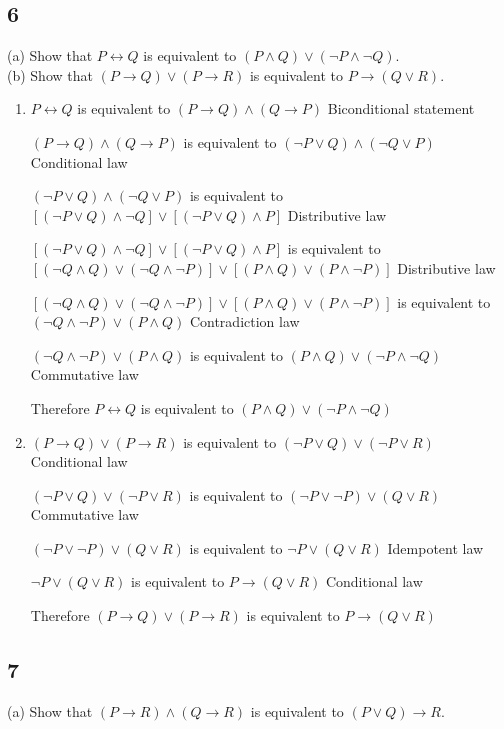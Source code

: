 \documentclass{article}
\begin{document}
\subsection{6}
(a) Show that $P \leftrightarrow Q$ is equivalent to $(P \land Q) \lor (\neg P \land \neg Q)$.
\\
(b) Show that $(P \rightarrow Q) \lor (P \rightarrow R)$ is equivalent to $P \rightarrow (Q \lor R)$.
\begin{enumerate} [label=(\alph*)]
    \item 
    $P \leftrightarrow Q$ is equivalent to $(P \rightarrow Q) \land (Q \rightarrow P)$ Biconditional statement
    
    $(P \rightarrow Q) \land (Q \rightarrow P)$ is equivalent to $(\neg P \lor Q) \land (\neg Q \lor P)$ Conditional law
    
    $(\neg P \lor Q) \land (\neg Q \lor P)$ is equivalent to $[(\neg P \lor  Q ) \land  \neg Q]\lor [(\neg P \lor Q )\land P]$ Distributive law
    
    $[(\neg P \lor  Q ) \land  \neg Q]\lor [(\neg P \lor Q )\land P]$ is equivalent to $[(\neg Q \land Q)\lor (\neg Q \land \neg P)]\lor[(P \land Q)\lor(P \land \neg P)]$ Distributive law
    
    $[(\neg Q \land Q)\lor (\neg Q \land \neg P)]\lor[(P \land Q)\lor(P \land \neg P)]$ is equivalent to $(\neg Q \land \neg P) \lor (P \land Q)$ Contradiction law
    
    $(\neg Q \land \neg P) \lor (P \land Q)$ is equivalent to $(P \land Q) \lor (\neg P \land \neg Q)$ Commutative law
    
    Therefore $P \leftrightarrow Q$ is equivalent to $(P \land Q) \lor (\neg P \land \neg Q)$
    \item
    $(P \rightarrow Q) \lor (P \rightarrow R)$ is equivalent to $(\neg P \lor Q) \lor (\neg P \lor R)$ Conditional law
    
    $(\neg P \lor Q) \lor (\neg P \lor R)$ is equivalent to $(\neg P \lor \neg P ) \lor (Q \lor R)$ Commutative law
    
    $(\neg P \lor \neg P ) \lor (Q \lor R)$ is equivalent to $\neg P \lor (Q \lor R)$ Idempotent law
    
    $\neg P \lor (Q \lor R)$ is equivalent to $P \rightarrow (Q \lor R)$ Conditional law
    
    Therefore $(P \rightarrow Q) \lor (P \rightarrow R)$ is equivalent to $P \rightarrow (Q \lor R)$
\end{enumerate}
\subsection{7}
(a) Show that $(P \rightarrow R) \land (Q \rightarrow R)$ is equivalent to $(P \lor Q) \rightarrow R$.
\end{document}
